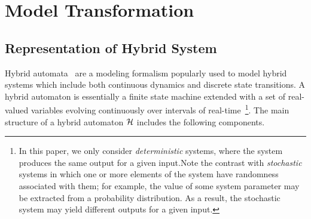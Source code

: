 %
%
%
\section{Model Transformation}
%
\subsection{Representation of Hybrid System}
Hybrid automata~\cite{alur1995algorithmic} are a modeling formalism popularly used to model hybrid systems which include both continuous dynamics and discrete state transitions. A hybrid automaton is essentially a finite state machine extended with a set of real-valued variables evolving continuously over intervals of real-time~\cite{alur1995algorithmic}\footnote{In this paper, we only consider \emph{deterministic} systems, where the system produces the same output for a given input.Note the contrast with {\em stochastic} systems in which one or more elements of the system have randomness associated with them; for example, the value of some system parameter may be extracted from a probability distribution. As a result, the stochastic system may yield different outputs for a given input.}.
The main structure of a hybrid automaton ${\mathcal H}$ includes the following components.
%
%
%
%
%

